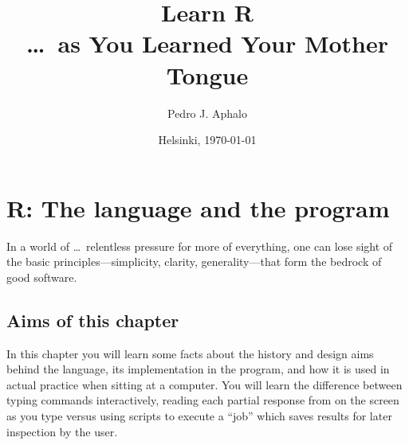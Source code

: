 \documentclass[krantz2]{krantz}\usepackage{knitr}
\begin{document}

\title{\Huge{\sffamily Learn R\\{\Large\ldots\ as You Learned Your Mother Tongue}}}

\author{Pedro J. Aphalo}

\date{Helsinki, \today}


















\frontmatter

\maketitle

\newpage

\setcounter{page}{7} %
\tableofcontents
%


\mainmatter






\chapter{R: The language and the program}\label{chap:R:introduction}

\begin{VF}
In a world of \ldots\ relentless pressure for more of everything, one can lose sight of the basic principles---simplicity, clarity, generality---that form the bedrock of good software.

\nocite{Kernighan1999}
\end{VF}


\section{Aims of this chapter}

In this chapter you will learn some facts about the history and design aims behind the \Rlang language, its implementation in the \Rpgrm program, and how it is used in actual practice when sitting at a computer. You will learn the difference between typing commands interactively, reading each partial response from \Rlang on the screen as you type versus using \Rlang scripts to execute a ``job'' which saves results for later inspection by the user.
\end{document}
